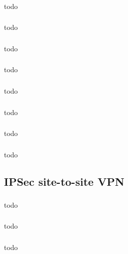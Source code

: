 \documentclass[a4paper, 12pt]{article}
\begin{document}
		\subsubsection{}
			todo

		\subsubsection{}
			todo

		\subsubsection{}
			todo

		\subsubsection{}
			todo

		\subsubsection{}
			todo

		\subsubsection{}
			todo

		\subsubsection{}
			todo

		\subsubsection{}
			todo

	\subsection{IPSec site-to-site VPN}

		\subsubsection{}
			todo

		\subsubsection{}
			todo

		\subsubsection{}
			todo
\end{document}
